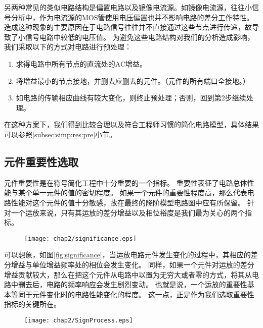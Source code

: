 另两种常见的类似电路结构是偏置电路以及镜像电流源。如镜像电流源，往往小信号分析中，作为电流源的MOS管使用电压偏置也并不影响电路的差分工作特性。
造成这种现象的主要原因在于电路信号往往并不直接通过这些节点进行传递，故导致了小信号电路中较低的电压值。
为避免这些电路结构对我们的分析造成影响，我们采取以下的方式对电路进行预处理：

\begin{enumerate}
	\item 求得电路中所有节点的直流处的AC增益。
	\item 将增益最小的节点接地，并删去应删去的元件。（元件的所有端口全接地。）
	\item 如电路的传输相应曲线有较大变化，则终止预处理；否则，回到第2步继续处理。
\end{enumerate}

在这种方案下，我们得到比较合理以及符合工程师习惯的简化电路模型，具体结果可以参照\ref{subsec:simp:res:pre}小节。

\subsection{元件重要性选取}
\label{subsec:simp:alg:significance}

元件重要性是在符号简化工程中十分重要的一个指标。
重要性表征了电路总体性能与某个单一元件的值的密切程度。
如果一个元件的重要性程度高，那么代表电路性能对这个元件的值十分敏感，故在最终的降阶模型电路图中应有所保留。
针对一个运放来说，只有其运放的差分增益以及相位裕度是我们最为关心的两个指标。

\begin{figure}[!htp]
	\centering
	\texttt{[image: chap2/significance.eps]}
\end{figure}

可以想象，如图\ref{fig:significance}，当运放电路元件发生变化的过程中，其相应的差分增益与单位增益频率处的相位会发生变化。
同样，如果一个元件对运放的差分增益贡献较大，那么在把这个元件从电路中以置为无穷大或者零的方式，将其从电路中删去后，电路的频率响应会发生剧烈变动。
也就是说，一个运放的重要性基本等同于元件变化时的电路性能变化的程度。
这一点，正是作为我们选取重要性指标的关键所在。

\begin{figure}[!htp]
	\centering
	\texttt{[image: chap2/SignProcess.eps]}
\end{figure}

